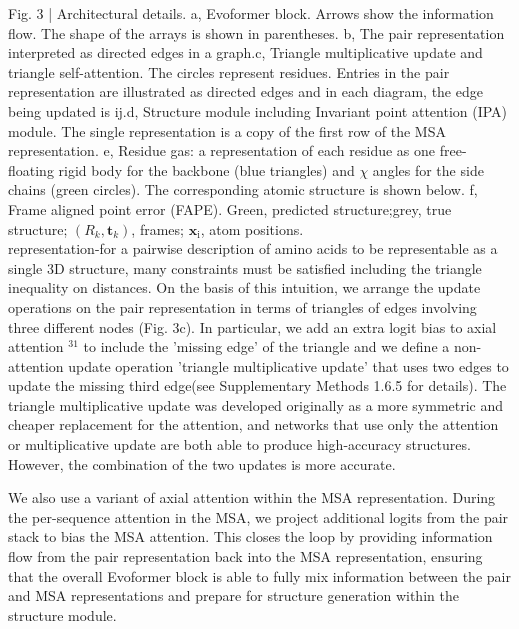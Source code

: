 \documentclass[10pt]{article}
\begin{document}
Fig. 3 | Architectural details. a, Evoformer block. Arrows show the information flow. The shape of the arrays is shown in parentheses. b, The pair representation interpreted as directed edges in a graph.c, Triangle multiplicative update and triangle self-attention. The circles represent residues. Entries in the pair representation are illustrated as directed edges and in each diagram, the edge being updated is ij.d, Structure module including Invariant point attention (IPA)\\
module. The single representation is a copy of the first row of the MSA representation. e, Residue gas: a representation of each residue as one free-floating rigid body for the backbone (blue triangles) and $\chi$ angles for the side chains (green circles). The corresponding atomic structure is shown below. f, Frame aligned point error (FAPE). Green, predicted structure;grey, true structure; $\left(R_{k}, \mathbf{t}_{k}\right)$, frames; $\mathbf{x}_{\mathrm{i}}$, atom positions.\\
representation-for a pairwise description of amino acids to be representable as a single 3D structure, many constraints must be satisfied including the triangle inequality on distances. On the basis of this intuition, we arrange the update operations on the pair representation in terms of triangles of edges involving three different nodes (Fig. 3c). In particular, we add an extra logit bias to axial attention ${ }^{31}$ to include the 'missing edge' of the triangle and we define a non-attention update operation 'triangle multiplicative update' that uses two edges to update the missing third edge(see Supplementary Methods 1.6.5 for details). The triangle multiplicative update was developed originally as a more symmetric and cheaper replacement for the attention, and networks that use only the attention or multiplicative update are both able to produce high-accuracy structures. However, the combination of the two updates is more accurate.

We also use a variant of axial attention within the MSA representation. During the per-sequence attention in the MSA, we project additional logits from the pair stack to bias the MSA attention. This closes the loop by providing information flow from the pair representation back into the MSA representation, ensuring that the overall Evoformer block is able to fully mix information between the pair and MSA representations and prepare for structure generation within the structure module.
\end{document}
